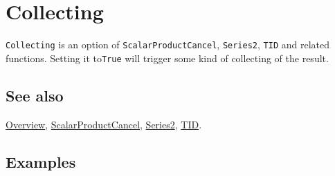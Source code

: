 \documentclass[../FeynCalcManual.tex]{subfiles}
\begin{document}
\hypertarget{collecting}{%
\section{Collecting}\label{collecting}}

\texttt{Collecting} is an option of \texttt{ScalarProductCancel},
\texttt{Series2}, \texttt{TID} and related functions. Setting it
to\texttt{True} will trigger some kind of collecting of the result.

\subsection{See also}

\hyperlink{toc}{Overview},
\hyperlink{scalarproductcancel}{ScalarProductCancel},
\hyperlink{series2}{Series2}, \hyperlink{tid}{TID}.

\subsection{Examples}
\end{document}

